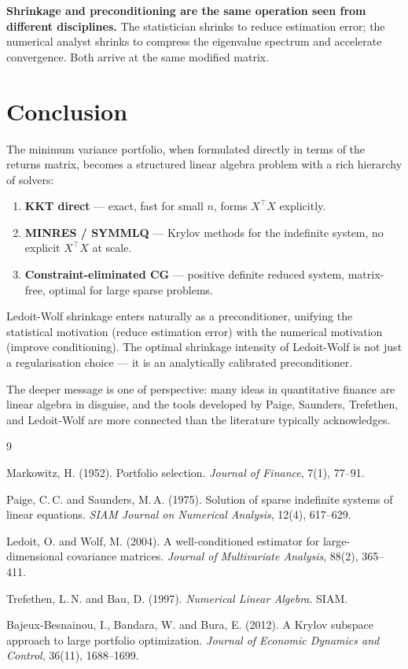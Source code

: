 \documentclass[11pt, a4paper]{article}
\begin{document}
\textbf{Shrinkage and preconditioning are the same operation seen from different disciplines.} The statistician shrinks to reduce estimation error; the numerical analyst shrinks to compress the eigenvalue spectrum and accelerate convergence. Both arrive at the same modified matrix.

\section{Conclusion}

The minimum variance portfolio, when formulated directly in terms of the returns matrix, becomes a structured linear algebra problem with a rich hierarchy of solvers:
\begin{enumerate}
  \item \textbf{KKT direct} — exact, fast for small $n$, forms $X^\top X$ explicitly.
  \item \textbf{MINRES / SYMMLQ} — Krylov methods for the indefinite system, no explicit $X^\top X$ at scale.
  \item \textbf{Constraint-eliminated CG} — positive definite reduced system, matrix-free, optimal for large sparse problems.
\end{enumerate}

Ledoit-Wolf shrinkage enters naturally as a preconditioner, unifying the statistical motivation (reduce estimation error) with the numerical motivation (improve conditioning). The optimal shrinkage intensity of Ledoit-Wolf is not just a regularisation choice — it is an analytically calibrated preconditioner.

The deeper message is one of perspective: many ideas in quantitative finance are linear algebra in disguise, and the tools developed by Paige, Saunders, Trefethen, and Ledoit-Wolf are more connected than the literature typically acknowledges.

\begin{thebibliography}{9}

Markowitz, H. (1952).
Portfolio selection.
\textit{Journal of Finance}, 7(1), 77--91.

Paige, C.\,C. and Saunders, M.\,A. (1975).
Solution of sparse indefinite systems of linear equations.
\textit{SIAM Journal on Numerical Analysis}, 12(4), 617--629.

Ledoit, O. and Wolf, M. (2004).
A well-conditioned estimator for large-dimensional covariance matrices.
\textit{Journal of Multivariate Analysis}, 88(2), 365--411.

Trefethen, L.\,N. and Bau, D. (1997).
\textit{Numerical Linear Algebra}.
SIAM.

Bajeux-Besnainou, I., Bandara, W. and Bura, E. (2012).
A Krylov subspace approach to large portfolio optimization.
\textit{Journal of Economic Dynamics and Control}, 36(11), 1688--1699.

\end{thebibliography}
\end{document}
